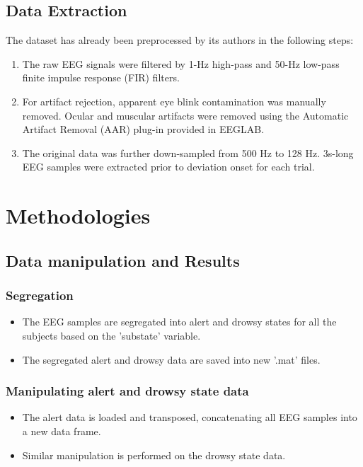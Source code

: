 \documentclass{IEEE_lsens}
\begin{document}
\subsection{Data Extraction}
The dataset has already been preprocessed by its authors in the following steps:
\begin{enumerate}
\item The raw EEG signals were filtered by 1-Hz high-pass and 50-Hz low-pass finite impulse response (FIR) filters.
\item For artifact rejection, apparent eye blink contamination was manually removed. Ocular and muscular artifacts were removed using the Automatic Artifact Removal (AAR) plug-in provided in EEGLAB.
\item The original data was further down-sampled from 500 Hz to 128 Hz. 3s-long EEG samples were extracted prior to deviation onset for each trial. 
\end{enumerate}
\section{Methodologies}
\vspace{-0.1cm}
\subsection{Data manipulation and Results}
\vspace{-0.15cm}
\subsubsection{Segregation}
\begin{itemize}
    \item The EEG samples are segregated into alert and drowsy states for all the subjects based on the 'substate' variable.
    \item The segregated alert and drowsy data are saved into new '.mat' files.
    \end{itemize}
\subsubsection{Manipulating alert and drowsy state data}
\begin{itemize}
\item The alert data is loaded and transposed, concatenating all EEG samples into a new data frame.
\item Similar manipulation is performed on the drowsy state data.
\end{itemize}
\end{document}
